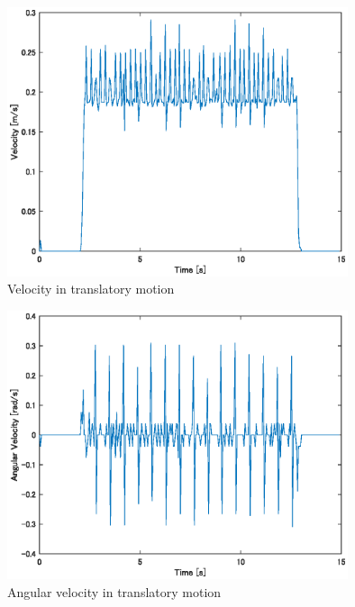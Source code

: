 \documentclass[a4paper,11pt]{jsarticle}
\begin{document}
\begin{figure}[H]\centering
\includegraphics[width=100mm]{figure/1_6.eps}
\caption{Velocity in translatory motion}
\label{ex1_6}\vspace{0zh}\end{figure}

\begin{figure}[H]\centering
\includegraphics[width=100mm]{figure/1_7.eps}
\caption{Angular velocity in translatory motion}
\label{ex1_7}\vspace{0zh}\end{figure}

\newpage
\end{document}

